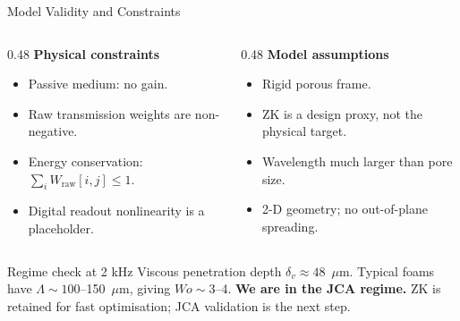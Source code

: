 \documentclass[aspectratio=169,11pt]{beamer}
\begin{document}
\begin{frame}{Model Validity and Constraints}
  \begin{columns}[T]
    \begin{column}{0.48\textwidth}
      \textbf{Physical constraints}
      \begin{itemize}
        \item Passive medium: no gain.
        \item Raw transmission weights are non-negative.
        \item Energy conservation: $\sum_i W_{\text{raw}}[i,j] \leq 1$.
        \item Digital readout nonlinearity is a placeholder.
      \end{itemize}
    \end{column}
    \begin{column}{0.48\textwidth}
      \textbf{Model assumptions}
      \begin{itemize}
        \item Rigid porous frame.
        \item \textcolor{gdpBurgundy}{ZK is a design proxy, not the physical target.}
        \item Wavelength much larger than pore size.
        \item 2-D geometry; no out-of-plane spreading.
      \end{itemize}
    \end{column}
  \end{columns}

  \vspace{0.4cm}
  \begin{alertblock}{Regime check at 2 kHz}
    Viscous penetration depth $\delta_v \approx 48$~$\mu$m. Typical foams have $\Lambda \sim 100$--150~$\mu$m, giving $Wo \sim 3$--4. \textbf{We are in the JCA regime.} ZK is retained for fast optimisation; JCA validation is the next step.
  \end{alertblock}
\end{frame}
\end{document}
